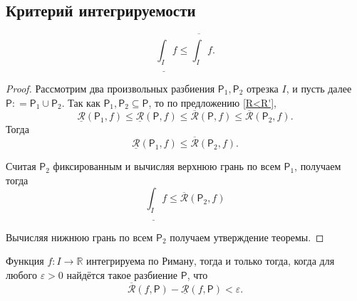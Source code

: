 \subsection{Критерий интегрируемости}


\begin{theorem}\label{Lint<=Uint}
 \[
  \underline{\int_I}f \le \overline{\int_I}f.
 \]
\end{theorem}
\begin{proof}
 Рассмотрим два произвольных разбиения $\mathsf{P}_1, \mathsf{P}_2$ отрезка $I$, и пусть далее $\mathsf{P}: = \mathsf{P}_1 \cup \mathsf{P}_2$. Так как $\mathsf{P}_1, \mathsf{P}_2 \subseteq \mathsf{P}$, то по предложению \ref{R<R'},
 \[
  \underline{\mathcal{R}}(\mathsf{P}_1,f) \le \underline{\mathcal{R}}(\mathsf{P},f) \le \overline{\mathcal{R}}(\mathsf{P},f) \le \overline{\mathcal{R}}(\mathsf{P}_2,f).
 \]
Тогда
\[
 \underline{\mathcal{R}}(\mathsf{P}_1,f) \le  \overline{\mathcal{R}}(\mathsf{P}_2,f).
\]

Считая $\mathsf{P}_2$ фиксированным и вычисляя верхнюю грань по всем $\mathsf{P}_1$, получаем тогда
\[
 \underline{\int_I}f \le \overline{\mathcal{R}}(\mathsf{P}_2,f)
\]

Вычисляя нижнюю грань по всем $\mathsf{P}_2$ получаем утверждение теоремы.

\end{proof}

\begin{theorem}\label{criteria_for_Rieman}
    Функция $f:I \to \mathbb{R}$ интегрируема по Риману, тогда и только тогда, когда для любого $\varepsilon>0$ найдётся такое разбиение $\mathsf{P}$, что
    \[
     \overline{\mathcal{R}}(f,\mathsf{P}) - \underline{\mathcal{R}}(f,\mathsf{P})<\varepsilon.
    \]
\end{theorem}

